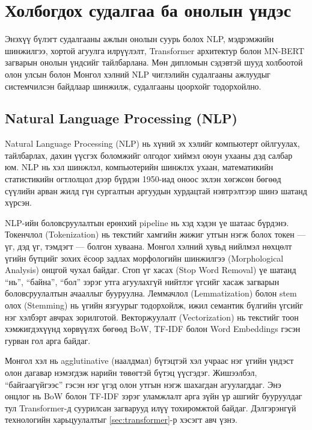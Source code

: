 
\chapter{Холбогдох судалгаа ба онолын үндэс}
\label{Chapter2}

Энэхүү бүлэгт судалгааны ажлын онолын суурь болох NLP, мэдрэмжийн шинжилгээ,
хортой агуулга илрүүлэлт, Transformer архитектур болон MN-BERT загварын онолын
үндсийг тайлбарлана. Мөн дипломын сэдэвтэй шууд холбоотой олон улсын болон
Монгол хэлний NLP чиглэлийн судалгааны ажлуудыг системчилсэн байдлаар шинжилж,
судалгааны цоорхойг тодорхойлно.


\section{Natural Language Processing (NLP)}

Natural Language Processing (NLP) нь хүний эх хэлийг компьютерт ойлгуулах,
тайлбарлах, дахин үүсгэх боломжийг олгодог хиймэл оюун ухааны дэд салбар юм.
NLP нь хэл шинжлэл, компьютерийн шинжлэх ухаан, математикийн статистикийн
огтлолцол дээр бүрдэн 1950-иад оноос эхлэн хөгжсөн бөгөөд сүүлийн арван жилд
гүн сургалтын аргуудын хурдацтай нэвтрэлтээр шинэ шатанд хүрсэн.

NLP-ийн боловсруулалтын ерөнхий pipeline нь хэд хэдэн үе шатаас бүрдэнэ.
Токенчлол (Tokenization) нь текстийг хамгийн жижиг утгын нэгж болох токен ---
үг, дэд үг, тэмдэгт --- болгон хуваана. Монгол хэлний хувьд нийлмэл нөхцөлт
үгийн бүтцийг зохих ёсоор задлах морфологийн шинжилгээ (Morphological
Analysis) онцгой чухал байдаг. Стоп үг хасах (Stop Word Removal) үе шатанд
``нь'', ``байна'', ``бол'' зэрэг утга агуулахгүй нийтлэг үгсийг хасаж загварын
боловсруулалтын ачааллыг бууруулна. Леммачлол (Lemmatization) болон stem олох
(Stemming) нь үгийн язгуурыг тодорхойлж, ижил семантик бүлгийн үгсийг нэг
хэлбэрт авчрах зорилготой. Векторжуулалт (Vectorization) нь текстийг тоон
хэмжигдэхүүнд хөрвүүлэх бөгөөд BoW, TF-IDF болон Word Embeddings гэсэн гурван
гол арга байдаг.

Монгол хэл нь agglutinative (наалдмал) бүтэцтэй хэл учраас нэг үгийн үндэст
олон дагавар нэмэгдэж нарийн төвөгтэй бүтэц үүсгэдэг. Жишээлбэл,
``байгаагүйгээс'' гэсэн нэг үгэд олон утгын нэгж шахагдан агуулагддаг. Энэ
онцлог нь BoW болон TF-IDF зэрэг уламжлалт арга зүйн үр ашгийг бууруулдаг тул
Transformer-д суурилсан загварууд илүү тохиромжтой байдаг. Дэлгэрэнгүй
технологийн харьцуулалтыг \ref{sec:transformer}-р хэсэгт авч үзнэ.

